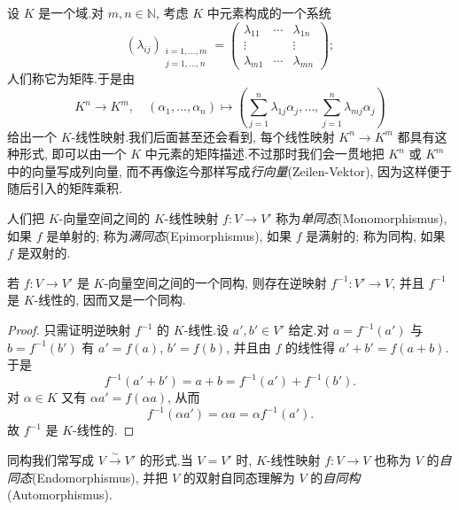 \begin{bsp}\label{bsp:2.1.3}
设 $K$ 是一个域.对 $m, n \in \mathbb{N}$, 考虑 $K$ 中元素构成的一个系统
\[
(\lambda_{ij})_{\substack{i = 1, \ldots, m \\ j = 1, \ldots, n}} = \begin{pmatrix} \lambda_{11} & \cdots & \lambda_{1n} \\ \vdots & & \vdots \\ \lambda_{m1} & \cdots & \lambda_{mn} \end{pmatrix};
\]
人们称它为矩阵.于是由
\[
K^n \longrightarrow K^m, \quad (\alpha_1, \ldots, \alpha_n) \longmapsto \left(\sum_{j = 1}^{n} \lambda_{1j}\alpha_j, \ldots, \sum_{j = 1}^{n} \lambda_{mj}\alpha_j\right)
\]
给出一个 $K$-线性映射.我们后面甚至还会看到, 每个线性映射 $K^n \longrightarrow K^m$ 都具有这种形式, 即可以由一个 $K$ 中元素的矩阵描述.不过那时我们会一贯地把 $K^n$ 或 $K^m$ 中的向量写成列向量, 而不再像迄今那样写成\emph{行向量}(\textup{Zeilen-Vektor}), 因为这样便于随后引入的矩阵乘积.
\end{bsp}

人们把 $K$-向量空间之间的 $K$-线性映射 $f \colon V \longrightarrow V'$ 称为\emph{单同态}(\textup{Monomorphismus}), 如果 $f$ 是单射的; 称为\emph{满同态}(\textup{Epimorphismus}), 如果 $f$ 是满射的; 称为同构, 如果 $f$ 是双射的.

\begin{remark}[同构的逆]\label{rem:2.1.2}
若 $f \colon V \longrightarrow V'$ 是 $K$-向量空间之间的一个同构, 则存在逆映射 $f^{-1} \colon V' \longrightarrow V$, 并且 $f^{-1}$ 是 $K$-线性的, 因而又是一个同构.
\end{remark}

\begin{proof}
只需证明逆映射 $f^{-1}$ 的 $K$-线性.设 $a', b' \in V'$ 给定.对 $a = f^{-1}(a')$ 与 $b = f^{-1}(b')$ 有 $a' = f(a)$, $b' = f(b)$, 并且由 $f$ 的线性得 $a' + b' = f(a + b)$.于是
\[
f^{-1}(a' + b') = a + b = f^{-1}(a') + f^{-1}(b')\text{.}
\]
对 $\alpha \in K$ 又有 $\alpha a' = f(\alpha a)$, 从而
\[
f^{-1}(\alpha a') = \alpha a = \alpha f^{-1}(a')\text{.}
\]
故 $f^{-1}$ 是 $K$-线性的.
\end{proof}

同构我们常写成 $V \overset{\sim}{\longrightarrow} V'$ 的形式.当 $V = V'$ 时, $K$-线性映射 $f \colon V \longrightarrow V$ 也称为 $V$ 的\emph{自同态}(\textup{Endomorphismus}), 并把 $V$ 的双射自同态理解为 $V$ 的\emph{自同构}(\textup{Automorphismus}).


